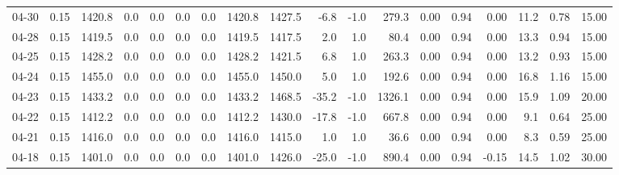 \begin{threeparttable}
{\begin{tabular}{lrrrrrrrrrrrrrrrrr}
  04-30 &     0.15 & 1420.8 &               0.0 &               0.0 &                0.0 &                0.0 & 1420.8 & 1427.5 &       -6.8 &                     -1.0 &               279.3 &       0.00 &      0.94 &           0.00 &             11.2 &            0.78 &                  15.00 \\
  04-28 &     0.15 & 1419.5 &               0.0 &               0.0 &                0.0 &                0.0 & 1419.5 & 1417.5 &        2.0 &                      1.0 &                80.4 &       0.00 &      0.94 &           0.00 &             13.3 &            0.94 &                  15.00 \\
  04-25 &     0.15 & 1428.2 &               0.0 &               0.0 &                0.0 &                0.0 & 1428.2 & 1421.5 &        6.8 &                      1.0 &               263.3 &       0.00 &      0.94 &           0.00 &             13.2 &            0.93 &                  15.00 \\
  04-24 &     0.15 & 1455.0 &               0.0 &               0.0 &                0.0 &                0.0 & 1455.0 & 1450.0 &        5.0 &                      1.0 &               192.6 &       0.00 &      0.94 &           0.00 &             16.8 &            1.16 &                  15.00 \\
  04-23 &     0.15 & 1433.2 &               0.0 &               0.0 &                0.0 &                0.0 & 1433.2 & 1468.5 &      -35.2 &                     -1.0 &              1326.1 &       0.00 &      0.94 &           0.00 &             15.9 &            1.09 &                  20.00 \\
  04-22 &     0.15 & 1412.2 &               0.0 &               0.0 &                0.0 &                0.0 & 1412.2 & 1430.0 &      -17.8 &                     -1.0 &               667.8 &       0.00 &      0.94 &           0.00 &              9.1 &            0.64 &                  25.00 \\
  04-21 &     0.15 & 1416.0 &               0.0 &               0.0 &                0.0 &                0.0 & 1416.0 & 1415.0 &        1.0 &                      1.0 &                36.6 &       0.00 &      0.94 &           0.00 &              8.3 &            0.59 &                  25.00 \\
  04-18 &     0.15 & 1401.0 &               0.0 &               0.0 &                0.0 &                0.0 & 1401.0 & 1426.0 &      -25.0 &                     -1.0 &               890.4 &       0.00 &      0.94 &          -0.15 &             14.5 &            1.02 &                  30.00 \\

\end{tabular}}
\end{threeparttable}
